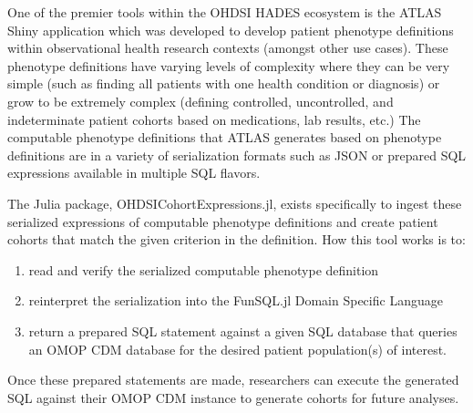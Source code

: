 \documentclass{juliacon}
\begin{document}

One of the premier tools within the OHDSI HADES ecosystem is the ATLAS Shiny application which was developed to develop patient phenotype definitions within observational health research contexts (amongst other use cases).
These phenotype definitions have varying levels of complexity where they can be very simple (such as finding all patients with one health condition or diagnosis) or grow to be extremely complex (defining controlled, uncontrolled, and indeterminate patient cohorts based on medications, lab results, etc.)
The computable phenotype definitions that ATLAS generates based on phenotype definitions are in a variety of serialization formats such as JSON or prepared SQL expressions available in multiple SQL flavors.

The Julia package, OHDSICohortExpressions.jl, exists specifically to ingest these serialized expressions of computable phenotype definitions and create patient cohorts that match the given criterion in the definition. \cite{evansOHDSICohortExpressionsJl2023}
How this tool works is to:

\begin{enumerate}

\item read and verify the serialized computable phenotype definition 

\item reinterpret the serialization into the FunSQL.jl Domain Specific Language 

\item return a prepared SQL statement against a given SQL database that queries an OMOP CDM database for the desired patient population(s) of interest.

\end{enumerate}

Once these prepared statements are made, researchers can execute the generated SQL against their OMOP CDM instance to generate cohorts for future analyses.
\end{document}
